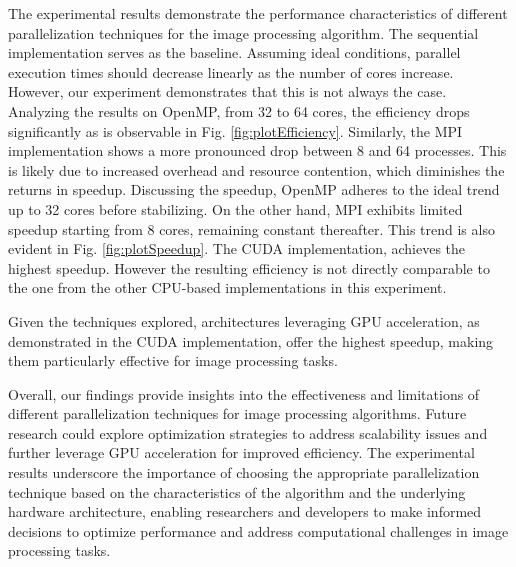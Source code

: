 



The experimental results demonstrate the performance characteristics of different %
parallelization techniques for the image processing algorithm. The sequential %
implementation serves as the baseline. Assuming ideal conditions, parallel execution %
times should decrease linearly as the number of cores increase. However, our experiment %
demonstrates that this is not always the case. Analyzing the results on OpenMP, from 32 to 64 %
cores, the efficiency drops significantly as is observable in Fig. \ref{fig:plotEfficiency}. %
Similarly, the MPI implementation shows a more pronounced drop between 8 and 64 %
processes. This is likely due to increased overhead and resource contention, which %
diminishes the returns in speedup.
Discussing the speedup, OpenMP adheres to the ideal trend up to 32 cores before %
stabilizing. On the other hand, MPI exhibits limited speedup starting from 8 %
cores, remaining constant thereafter. This trend is also evident in Fig. \ref{fig:plotSpeedup}. %
The CUDA implementation, achieves the highest speedup. However the %
resulting efficiency is not directly comparable to the one from the other %
CPU-based implementations in this experiment.

Given the techniques explored, architectures leveraging GPU acceleration, as %
demonstrated in the CUDA implementation, offer the highest speedup, making them %
particularly effective for image processing tasks.

Overall, our findings provide insights into the effectiveness and limitations of %
different parallelization techniques for image processing algorithms. Future %
research could explore optimization strategies to address scalability issues and %
further leverage GPU acceleration for improved efficiency. The experimental results %
underscore the importance of choosing the appropriate parallelization technique %
based on the characteristics of the algorithm and the underlying hardware %
architecture, enabling researchers and developers to make informed decisions to %
optimize performance and address computational challenges in image processing %
tasks.
